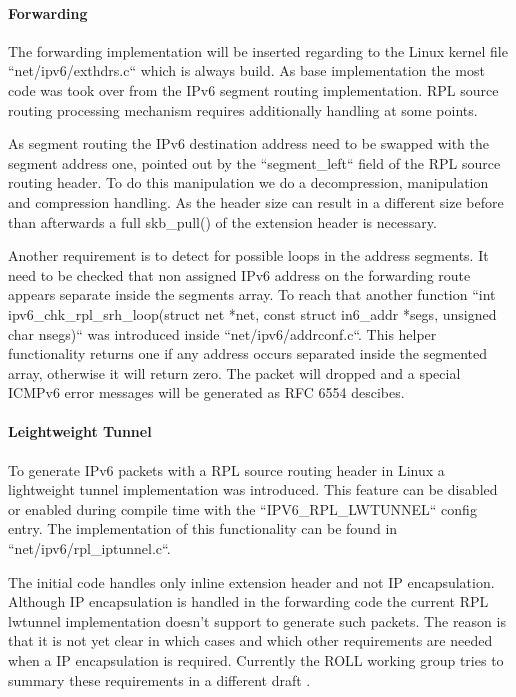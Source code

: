 \documentclass[letterpaper]{article}
\begin{document}
\paragraph{Forwarding}

The forwarding implementation will be inserted regarding to the Linux kernel file ``net/ipv6/exthdrs.c`` which is always build.
As base implementation the most code was took over from the IPv6 segment routing implementation.
RPL source routing processing mechanism requires additionally handling at some points.

As segment routing the IPv6 destination address need to be swapped with the segment address one, pointed out by the ``segment\_left`` field of the RPL source routing header.
To do this manipulation we do a decompression, manipulation and compression handling.
As the header size can result in a different size before than afterwards a full skb\_pull() of the extension header is necessary.

Another requirement is to detect for possible loops in the address segments.
It need to be checked that non assigned IPv6 address on the forwarding route appears separate inside the segments array.
To reach that another function ``int ipv6\_chk\_rpl\_srh\_loop(struct net *net, const struct in6\_addr *segs, unsigned char nsegs)`` was introduced inside ``net/ipv6/addrconf.c``.
This helper functionality returns one if any address occurs separated inside the segmented array, otherwise it will return zero.
The packet will dropped and a special ICMPv6 error messages will be generated as RFC 6554 descibes.

\paragraph{Leightweight Tunnel}

To generate IPv6 packets with a RPL source routing header in Linux a lightweight tunnel implementation was introduced.
This feature can be disabled or enabled during compile time with the ``IPV6\_RPL\_LWTUNNEL`` config entry.
The implementation of this functionality can be found in ``net/ipv6/rpl\_iptunnel.c``.

The initial code handles only inline extension header and not IP encapsulation.
Although IP encapsulation is handled in the forwarding code the current RPL lwtunnel implementation doesn't support to generate such packets.
The reason is that it is not yet clear in which cases and which other requirements are needed when a IP encapsulation is required.
Currently the ROLL working group tries to summary these requirements in a different draft \cite{I-D.ietf-roll-useofrplinfo}.
\end{document}
